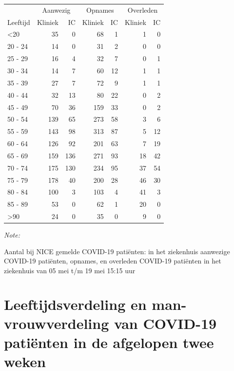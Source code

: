 \documentclass[
  english,
  man,floatsintext]{apa6}
\begin{document}
\begin{table}
\centering\begingroup\fontsize{10}{12}\selectfont

\begin{threeparttable}
\begin{tabular}{lrrrrrr}
\toprule
\multicolumn{1}{c}{ } & \multicolumn{2}{c}{Aanwezig} & \multicolumn{2}{c}{Opnames} & \multicolumn{2}{c}{Overleden} \\
\cmidrule(l{3pt}r{3pt}){2-3} \cmidrule(l{3pt}r{3pt}){4-5} \cmidrule(l{3pt}r{3pt}){6-7}
Leeftijd & Kliniek & IC & Kliniek & IC & Kliniek & IC\\
\midrule
<20 & 35 & 0 & 68 & 1 & 1 & 0\\
20 - 24 & 14 & 0 & 31 & 2 & 0 & 0\\
25 - 29 & 16 & 4 & 32 & 7 & 0 & 1\\
30 - 34 & 14 & 7 & 60 & 12 & 1 & 1\\
35 - 39 & 27 & 7 & 72 & 9 & 1 & 1\\
40 - 44 & 32 & 13 & 80 & 22 & 0 & 2\\
45 - 49 & 70 & 36 & 159 & 33 & 0 & 2\\
50 - 54 & 139 & 65 & 273 & 58 & 3 & 6\\
55 - 59 & 143 & 98 & 313 & 87 & 5 & 12\\
60 - 64 & 126 & 92 & 201 & 63 & 7 & 19\\
65 - 69 & 159 & 136 & 271 & 93 & 18 & 42\\
70 - 74 & 175 & 130 & 234 & 95 & 37 & 54\\
75 - 79 & 178 & 40 & 200 & 28 & 46 & 30\\
80 - 84 & 100 & 3 & 103 & 4 & 41 & 3\\
85 - 89 & 53 & 0 & 62 & 1 & 20 & 0\\
>90 & 24 & 0 & 35 & 0 & 9 & 0\\
\bottomrule
\end{tabular}
\begin{tablenotes}
\item \textit{Note: } 
\item Aantal bij NICE gemelde COVID-19 patiënten: in het ziekenhuis aanwezige COVID-19 patiënten, opnames, en overleden COVID-19 patiënten in het ziekenhuis van 05 mei t/m 19 mei 15:15 uur
\end{tablenotes}
\end{threeparttable}
\endgroup{}
\end{table}

\newpage

\hypertarget{leeftijdsverdeling-en-man-vrouwverdeling-van-covid-19-patiuxebnten-in-de-afgelopen-twee-weken}{%
\section{Leeftijdsverdeling en man-vrouwverdeling van COVID-19 patiënten in de afgelopen twee weken}\label{leeftijdsverdeling-en-man-vrouwverdeling-van-covid-19-patiuxebnten-in-de-afgelopen-twee-weken}}
\end{document}

